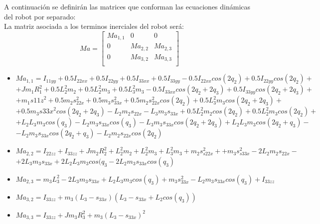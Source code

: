 \newpage
A continuación se definirán las matrices que conforman las ecuaciones dinámicas del robot por separado: \\
La matriz asociada a los terminos inerciales del robot será:
\[
Ma=
\begin{bmatrix}
Ma_{1,1} & 0 & 0\\
0 & Ma_{2,2} & Ma_{2,3}\\
0 & Ma_{3,2} & Ma_{3,3}\\
\end{bmatrix} \]

\begin{itemize}
	\item $Ma_{1,1}= I_{11yy}+0.5I_{22xx}+0.5I_{22yy}+0.5I_{33xx} +0.5I_{33yy} - 0.5I_{22xx}cos(2q_{2})+0.5I_{22yy}cos(2q_2) +$ \\ \vspace{0.1cm}
	$+ Jm_1R_{1}^{2} + 0.5L_{2}^{2}m_{2} +0.5L_{2}^{2}m_{3}+ 0.5L_{3}^{2}m_{3}- 0.5I_{33xx}cos(2q_{2} + 2q_{3}) +0.5I_{33yy}cos(2q_{2} + 2q_{3}) +$ \\ \vspace{0.1cm}
	$+ m_{1}s{11z}^{2} + 0.5m_{2}s_{22x}^{2}+ 0.5m_{3}s_{33x}^{2}+ 0.5m_{2}s_{22x}^{2}cos(2q_{2})+ 0.5L_{3}^{2}m_{3}cos(2q_{2} + 2q_{3})+ $ \\ \vspace{0.1cm}
	$+ 0.5m_{3}s{33x}^{2}cos(2q_{2}+2q_{3}) - L_{2}m_{2}s_{22x}- L_{3}m_{3}s_{33x} + 0.5L_{2}^{2}m_{2}cos(2q_{2})+ 0.5L_{2}^{2}m_{3}cos(2q_{2})+ $ \\ \vspace{0.1cm}
	$+ L_{2}L_{3}m_{3}cos(q_{3}) -L_{2}m_{3}s_{33x}cos(q_{3})- L_{3}m_{3}s_{33x}cos(2q_{2} + 2q_{3})+L_{2}L_{3}m_{3}cos(2q_{2} + q_{3}) - $ \\ \vspace{0.1cm}
	$- L_{2}m_{3}s_{33x}cos(2q_{2} + q_{3})-L_{2}m_{2}s_{22x}cos(2q_{2})$ \\ \vspace{0.2cm}
	\item $Ma_{2,2}=I_{22zz}+I_{33zz}+Jm_{2}R_{2}^{2}+L_{2}^{2}m_{2}+L_{2}^{2}m_{3}+L_{3}^{2}m_{3}+m_{2}s_{s22x}^{2}++m_{3}s_{s33x}^{2}- 2L_{2}m_{2}s_{22x} - $ \\ \vspace{0.1cm}
	$ + 2L_{3}m_{3}s_{33x}+ 2L_{2}L_{3}m_{3}cos(q_{3}-2L_{2}m_{3}s_{33x}cos(q_{3})$ \\ \vspace{0.2cm}
	\item $Ma_{2,3}=m_{3}L_{3}^{2}- 2L_{3}m_{3}s_{33x}+L_{2}L_{3}m_{3}cos(q_{3})+m_{3}s_{33x}^{2}-L_{2}m_{3}s_{33x}cos(q_{3})+I_{33zz}$ \\ \vspace{0.2cm}
	\item $Ma_{3,2}=I_{33zz}+m_{3}(L_{3}-s_{33x})(L_{3}-s_{33x}+L_{2}cos(q_{3}))$ \\ \vspace{0.2cm}
	\item $Ma_{3,3}=I_{33zz}+Jm_{3}R_{3}^{2}+m_{3}(L_{3}-s_{33x})^{2}$ \\ \vspace{0.2cm}
\end{itemize}

